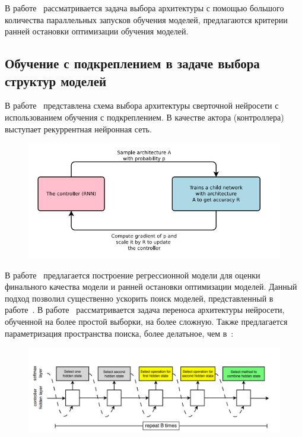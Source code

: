 В работе~\cite{optimal_racing} рассматривается задача выбора архитектуры с помощью большого количества параллельных запусков обучения моделей, предлагаются критерии ранней остановки оптимизации обучения моделей.


\subsection*{ Обучение с подкреплением в задаче выбора структур моделей}
В работе~\cite{reinf} представлена схема выбора архитектуры сверточной нейросети с использованием обучения с подкреплением. В качестве актора (контроллера) выступает рекуррентная нейронная сеть.
\begin{figure}[H]
\includegraphics[width=\textwidth]{./plots/arch_review_figs/reinf.png}
\end{figure}
В работе~\cite{reinf_predict} предлагается построение регрессионной модели для оценки финального качества модели и ранней остановки оптимизации моделей. Данный подход позволил существенно ускорить поиск моделей, представленный в работе~\cite{reinf}.
В работе~\cite{reinf_transfer} рассматривается задача переноса архитектуры нейросети, обученной на более простой выборки, на более сложную. Также предлагается параметризация пространства поиска, более делатьное, чем в~\cite{reinf}:
\begin{figure}[H]
\includegraphics[width=\textwidth]{./plots/arch_review_figs/reinf2.png}
\end{figure}

